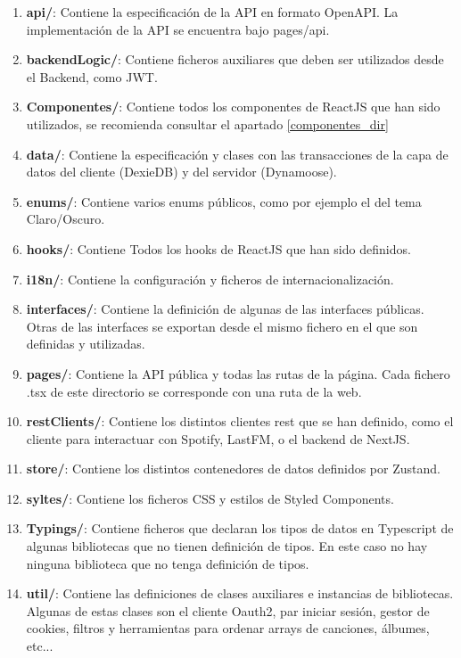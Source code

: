 \begin{enumerate}
    \item \textbf{api/}: Contiene la especificación de la API en formato OpenAPI. La implementación de la API se encuentra bajo pages/api.
    \item \textbf{backendLogic/}: Contiene ficheros auxiliares que deben ser utilizados desde el Backend, como JWT.
    \item \textbf{Componentes/}: Contiene todos los componentes de ReactJS que han sido utilizados, se recomienda consultar el apartado \ref{componentes_dir}
    \item \textbf{data/}: Contiene la especificación y clases con las transacciones de la capa de datos del cliente (DexieDB) y del servidor (Dynamoose).
    \item \textbf{enums/}: Contiene varios enums públicos, como por ejemplo el del tema Claro/Oscuro. 
    \item \textbf{hooks/}: Contiene Todos los hooks de ReactJS que han sido definidos.
    \item \textbf{i18n/}: Contiene la configuración y ficheros de internacionalización.
    \item \textbf{interfaces/}: Contiene la definición de algunas de las interfaces públicas. Otras de las interfaces se exportan desde el mismo fichero en el que son definidas y utilizadas. 
    \item \textbf{pages/}: Contiene la API pública y todas las rutas de la página. Cada fichero .tsx de este directorio se corresponde con una ruta de la web.
    \item \textbf{restClients/}: Contiene los distintos clientes rest que se han definido, como el cliente para interactuar con Spotify, LastFM, o el backend de NextJS.
    \item\textbf{store/}: Contiene los distintos contenedores de datos definidos por Zustand. 
    \item\textbf{syltes/}: Contiene los ficheros CSS y estilos de Styled Components.
    \item\textbf{Typings/}: Contiene ficheros que declaran los tipos de datos en Typescript de algunas bibliotecas que no tienen definición de tipos. En este caso no hay ninguna biblioteca que no tenga definición de tipos. 
    \item\textbf{util/}: Contiene las definiciones de clases auxiliares e instancias de bibliotecas. Algunas de estas clases son el cliente Oauth2, par iniciar sesión, gestor de cookies, filtros y herramientas para ordenar arrays de canciones, álbumes, etc...
\end{enumerate}

